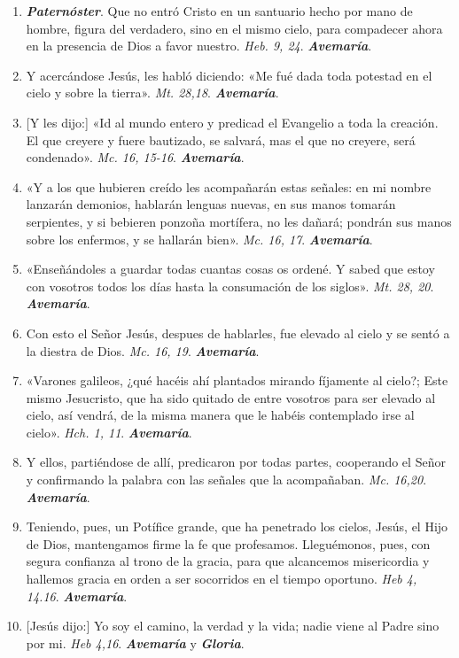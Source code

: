 \documentclass[./rosary.tex]{subfiles}
\begin{document}
\begin{enumerate}
    \item \textbf{\emph{Paternóster}}. Que no entró Cristo en un santuario hecho por mano de hombre, figura del verdadero, sino en el mismo cielo, para compadecer ahora en
          la presencia de Dios a favor nuestro. \emph{Heb. 9, 24}. \textbf{\emph{Avemaría}}.

    \item Y acercándose Jesús, les habló diciendo: «Me fué dada toda potestad en el cielo y sobre la tierra». \emph{Mt. 28,18}. \textbf{\emph{Avemaría}}.

    \item {[Y les dijo:]} «Id al mundo entero y predicad el Evangelio a toda la creación. El que creyere y fuere bautizado,
          se salvará, mas el que no creyere, será condenado». \emph{Mc. 16, 15-16}. \textbf{\emph{Avemaría}}.

    \item «Y a los que hubieren creído les acompañarán estas señales: en mi nombre lanzarán demonios, hablarán lenguas nuevas, en sus manos tomarán serpientes,
          y si bebieren ponzoña mortífera, no les dañará; pondrán sus manos sobre los enfermos, y se hallarán bien». \emph{Mc. 16, 17}. \textbf{\emph{Avemaría}}.

    \item «Enseñándoles a guardar todas cuantas cosas os ordené. Y sabed que estoy con vosotros todos los días hasta la consumación de los siglos».
          \emph{Mt. 28, 20}. \textbf{\emph{Avemaría}}.

    \item Con esto el Señor Jesús, despues de hablarles, fue elevado al cielo y se sentó a la diestra de Dios. \emph{Mc. 16, 19}. \textbf{\emph{Avemaría}}.

    \item «Varones galileos, ¿qué hacéis ahí plantados mirando fíjamente al cielo?; Este mismo Jesucristo, que ha sido quitado de entre vosotros
          para ser elevado al cielo, así vendrá, de la misma manera que le habéis contemplado irse al cielo». \emph{Hch. 1, 11}. \textbf{\emph{Avemaría}}.

    \item Y ellos, partiéndose de allí, predicaron por todas partes, cooperando el Señor y confirmando la palabra con las señales que la acompañaban.
          \emph{Mc. 16,20}. \textbf{\emph{Avemaría}}.

    \item Teniendo, pues, un Potífice grande, que ha penetrado los cielos, Jesús, el Hijo de Dios, mantengamos firme la fe que profesamos. Lleguémonos, pues,
          con segura confianza al trono de la gracia, para que alcancemos misericordia y hallemos gracia en orden a ser socorridos en el tiempo oportuno.
          \emph{Heb 4, 14.16}. \textbf{\emph{Avemaría}}.

    \item {[Jesús dijo:]} Yo soy el camino, la verdad y la vida; nadie viene al Padre sino por mi. \emph{Heb 4,16}. \textbf{\emph{Avemaría}} y \textbf{\emph{Gloria}}.
\end{enumerate}
\end{document}
